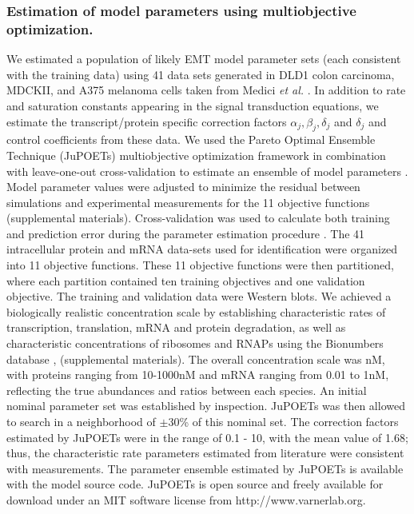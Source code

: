 \documentclass[11pt,letterpaper]{article}
\begin{document}
\subsubsection*{Estimation of model parameters using multiobjective optimization.}
We estimated a population of likely EMT model parameter sets (each consistent with the training data)
using 41 data sets generated in DLD1 colon carcinoma, MDCKII, and A375 melanoma cells taken from Medici \emph{et al.} \cite{Medici:2008fk}.
In addition to rate and saturation constants appearing in the signal transduction equations, we estimate the transcript/protein specific
correction factors $\alpha_{j},\beta_{j},\delta_{j}$ and $\delta_{j}$ and control coefficients from these data.
We used the Pareto Optimal Ensemble Technique (JuPOETs) multiobjective optimization framework in combination
with leave-one-out cross-validation to estimate an ensemble of model parameters \cite{Song:2010fk,JuPOETs-BioArXiv}.
Model parameter values were adjusted to minimize the residual between simulations and experimental measurements for the 11 objective functions (supplemental materials).
Cross-validation was used to calculate both training and prediction error during the parameter estimation procedure \cite{kohavi1995study}.
The 41 intracellular protein and mRNA data-sets used for identification were organized into 11 objective functions.
These 11 objective functions were then partitioned, where each partition contained ten training objectives and one validation objective.
The training and validation data were Western blots. We achieved a biologically realistic concentration scale by establishing characteristic rates of transcription, translation, mRNA and protein degradation, as well as characteristic concentrations of ribosomes and RNAPs using the Bionumbers database \cite{Milo:2010aa}, (supplemental materials).
The overall concentration scale was nM, with proteins ranging from 10-1000nM and mRNA ranging from 0.01 to 1nM, reflecting the true abundances and ratios between each species.
An initial nominal parameter set was established by inspection. JuPOETs was then allowed to search in a neighborhood of $\pm$30\% of this nominal set.
The correction factors estimated by JuPOETs were in the range of 0.1 - 10, with the mean value of 1.68; thus, the characteristic rate parameters estimated from literature were consistent with measurements.
The parameter ensemble estimated by JuPOETs is available with the model source code.
JuPOETs is open source and freely available for download under an MIT software license from http://www.varnerlab.org.
\end{document}

